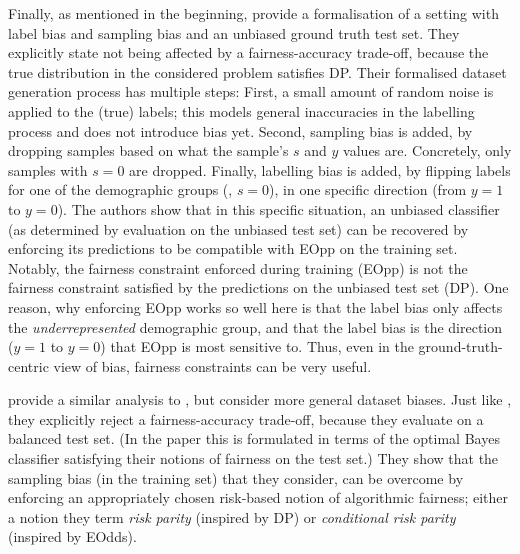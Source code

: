 Finally, as mentioned in the beginning,
\citet{blum2020recovering} provide a formalisation of a setting with label bias and sampling bias
and an unbiased ground truth test set.
They explicitly state not being affected by a fairness-accuracy trade-off,
because the true distribution in the considered problem satisfies \acf{DP}.
Their formalised dataset generation process has multiple steps:
First, a small amount of random noise is applied to the (true) labels;
this models general inaccuracies in the labelling process and does not introduce bias yet.
Second, sampling bias is added, by dropping samples based on what the sample's \(s\) and \(y\) values are.
Concretely, only samples with \(s=0\) are dropped.
Finally, labelling bias is added, by flipping labels for one of the demographic groups (\eg, \(s=0\)),
in one specific direction (from \(y=1\) to \(y=0\)).
The authors show that in this specific situation,
an unbiased classifier (as determined by evaluation on the unbiased test set) can be recovered
by enforcing its predictions to be compatible with \acf{EOpp} on the training set.
Notably, the fairness constraint enforced during training (\ac{EOpp})
is not the fairness constraint satisfied by the predictions on the unbiased test set (\ac{DP}).
One reason, why enforcing \ac{EOpp} works so well here is
that the label bias only affects the \emph{underrepresented} demographic group,
and that the label bias is the direction (\(y=1\) to \(y=0\)) that \ac{EOpp} is most sensitive to.
Thus, even in the ground-truth-centric view of bias,
fairness constraints can be very useful.

\citet{maity2020notradeoff} provide a similar analysis to \citet{blum2020recovering},
but consider more general dataset biases.
Just like \citet{blum2020recovering}, they explicitly reject a fairness-accuracy trade-off,
because they evaluate on a balanced test set.
(In the paper this is formulated in terms of the optimal Bayes classifier satisfying their notions of fairness on the test set.)
They show that the sampling bias (in the training set) that they consider,
can be overcome by enforcing an appropriately chosen risk-based notion of algorithmic fairness;
either a notion they term \emph{risk parity} (inspired by \ac{DP})
or \emph{conditional risk parity} (inspired by \ac{EOdds}).

